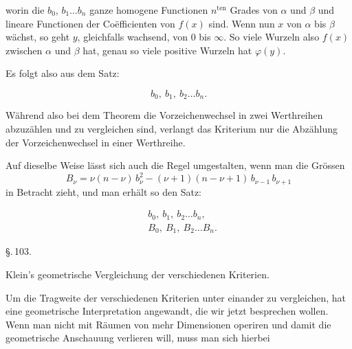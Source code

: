 worin die $b_0$, $b_1 \ldots b_n$ ganze homogene Functionen $n^{\mathrm{ten}}$ Grades von $\alpha$ und $\beta$ und lineare Functionen der Co\"efficienten von $f(x)$ sind. Wenn nun $x$ von $\alpha$ bis $\beta$ wächst, so geht $y$, gleichfalls wachsend, von $0$ bis $\infty$. So viele Wurzeln also $f(x)$ zwischen $\alpha$ und $\beta$ hat, genau so viele positive Wurzeln hat $\varphi(y)$.

Es folgt also aus dem  Satz:

\[
b_0,\ b_1,\ b_2 \ldots b_n.
\]

Während also bei dem  Theorem die Vorzeichenwechsel in zwei Werthreihen abzuzählen und zu vergleichen sind, verlangt das  Kriterium nur die Abzählung der Vorzeichenwechsel in einer Werthreihe.

Auf dieselbe Weise lässt sich auch die  Regel umgestalten, wenn man die Grössen
\[
B_\nu = \nu(n-\nu)\,b_\nu^2 - (\nu+1)(n-\nu+1)\,b_{\nu-1}\,b_{\nu+1}
\]
in Betracht zieht, und man erhält so den Satz:

\[
\begin{aligned}
&b_0,\ b_1,\ b_2 \ldots b_n,\\
&B_0,\ B_1,\ B_2 \ldots B_n.
\end{aligned}
\]

\begin{center}
\S.\,103.

Klein's geometrische Vergleichung der verschiedenen Kriterien.
\end{center}

Um die Tragweite der verschiedenen Kriterien unter einander zu vergleichen, hat  eine geometrische Interpretation angewandt, die wir jetzt besprechen wollen. Wenn man nicht mit Räumen von mehr Dimensionen operiren und damit die geometrische Anschauung verlieren will, muss man sich hierbei
